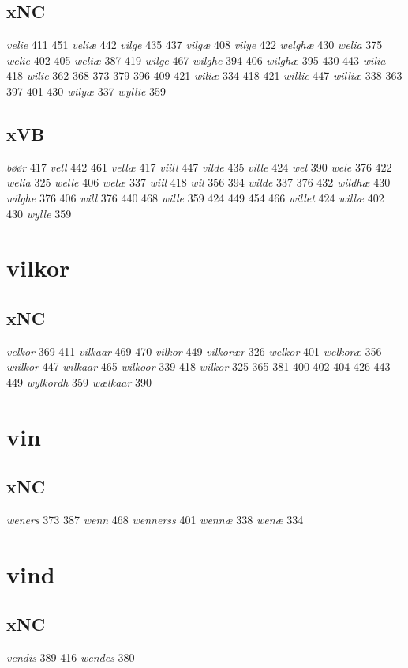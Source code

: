 \documentclass[a4paper,twocolumn]{article}
\begin{document}
\subsection{xNC}
\label{sec:orgd645bd1}
\emph{velie} 411 451 \emph{veliæ} 442 \emph{vilge} 435 437 \emph{vilgæ} 408 \emph{vilye} 422 \emph{welghæ} 430 \emph{welia} 375 \emph{welie} 402 405 \emph{weliæ} 387 419 \emph{wilge} 467 \emph{wilghe} 394 406 \emph{wilghæ} 395 430 443 \emph{wilia} 418 \emph{wilie} 362 368 373 379 396 409 421 \emph{wiliæ} 334 418 421 \emph{willie} 447 \emph{williæ} 338 363 397 401 430 \emph{wilyæ} 337 \emph{wyllie} 359 
\subsection{xVB}
\label{sec:org7dfc520}
\emph{bøør} 417 \emph{vell} 442 461 \emph{vellæ} 417 \emph{viill} 447 \emph{vilde} 435 \emph{ville} 424 \emph{wel} 390 \emph{wele} 376 422 \emph{welia} 325 \emph{welle} 406 \emph{welæ} 337 \emph{wiil} 418 \emph{wil} 356 394 \emph{wilde} 337 376 432 \emph{wildhæ} 430 \emph{wilghe} 376 406 \emph{will} 376 440 468 \emph{wille} 359 424 449 454 466 \emph{willet} 424 \emph{willæ} 402 430 \emph{wylle} 359 
\section{vilkor}
\label{sec:org270f6f7}
\subsection{xNC}
\label{sec:org41da45d}
\emph{velkor} 369 411 \emph{vilkaar} 469 470 \emph{vilkor} 449 \emph{vilkorær} 326 \emph{welkor} 401 \emph{welkoræ} 356 \emph{wiilkor} 447 \emph{wilkaar} 465 \emph{wilkoor} 339 418 \emph{wilkor} 325 365 381 400 402 404 426 443 449 \emph{wylkordh} 359 \emph{wælkaar} 390 
\section{vin}
\label{sec:org1d0d467}
\subsection{xNC}
\label{sec:org1bc6dfd}
\emph{weners} 373 387 \emph{wenn} 468 \emph{wennerss} 401 \emph{wennæ} 338 \emph{wenæ} 334 
\section{vind}
\label{sec:org6fcebf5}
\subsection{xNC}
\label{sec:org708546a}
\emph{vendis} 389 416 \emph{wendes} 380 
\end{document}

